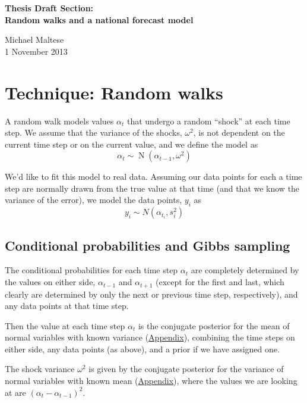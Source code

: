 \documentclass[12pt]{article}
\DeclareMathOperator{\N}{N}
\begin{document}
\begin{flushleft}{\normalfont\sffamily\LARGE\bfseries Thesis Draft Section: \\ Random walks and a national forecast model\par} \large{Michael Maltese \\ 1 November 2013}\\[2em]\end{flushleft}

\section*{Technique: Random walks}

A random walk models values $\alpha_t$ that undergo a random ``shock'' at each time step. We assume that the variance of the shocks, $\omega^2$, is not dependent on the current time step or on the current value, and we define the model as \[ \alpha_t \sim \N(\alpha_{t-1}, \omega^2) \]


We'd like to fit this model to real data. Assuming our data points for each a time step are normally drawn from the true value at that time (and that we know the variance of the error), we model the data points, $y_i$ as \[y_i \sim N(\alpha_{t_i}, s^2_i)\]

\subsection*{Conditional probabilities and Gibbs sampling}

The conditional probabilities for each time step $\alpha_t$ are completely determined by the values on either side, $\alpha_{t-1}$ and $\alpha_{t+1}$ (except for the first and last, which clearly are determined by only the next or previous time step, respectively), and any data points at that time step.

Then the value at each time step $\alpha_t$ is the conjugate posterior for the mean of normal variables with known variance (\hyperref[sec:conj:gaussianwithprecision]{Appendix}), combining the time steps on either side, any data points (as above), and a prior if we have assigned one.

The shock variance $\omega^2$ is given by the conjugate posterior for the variance of normal variables with known mean (\hyperref[sec:conj:gaussianwithmean]{Appendix}), where the values we are looking at are $(\alpha_t - \alpha_{t-1})^2$.
\end{document}
